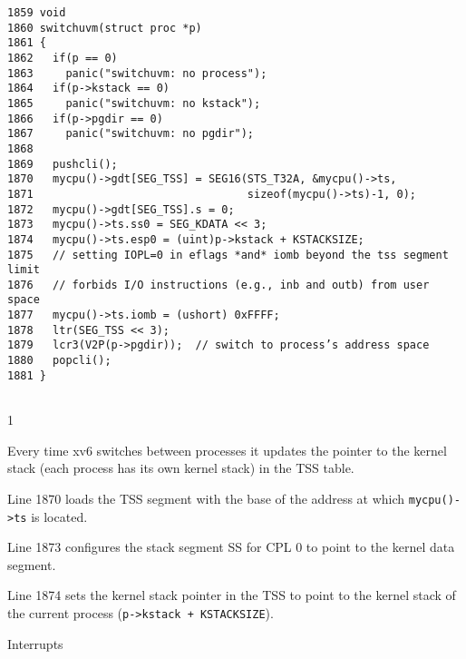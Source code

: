 \documentclass[11pt]{exam}
\def\answers{1}
\begin{document}
\begin{questions}
\begin{parts}
\begin{verbatim}
1859 void
1860 switchuvm(struct proc *p)
1861 {
1862   if(p == 0)
1863     panic("switchuvm: no process");
1864   if(p->kstack == 0)
1865     panic("switchuvm: no kstack");
1866   if(p->pgdir == 0)
1867     panic("switchuvm: no pgdir");
1868 
1869   pushcli();
1870   mycpu()->gdt[SEG_TSS] = SEG16(STS_T32A, &mycpu()->ts,
1871                                 sizeof(mycpu()->ts)-1, 0);
1872   mycpu()->gdt[SEG_TSS].s = 0;
1873   mycpu()->ts.ss0 = SEG_KDATA << 3;
1874   mycpu()->ts.esp0 = (uint)p->kstack + KSTACKSIZE;
1875   // setting IOPL=0 in eflags *and* iomb beyond the tss segment limit
1876   // forbids I/O instructions (e.g., inb and outb) from user space
1877   mycpu()->ts.iomb = (ushort) 0xFFFF;
1878   ltr(SEG_TSS << 3);
1879   lcr3(V2P(p->pgdir));  // switch to process’s address space
1880   popcli();
1881 }
	
\end{verbatim}

\if\answers1 

Every time xv6 switches between processes it updates the pointer to the 
	kernel stack (each process has its own kernel stack) in the TSS table. 

Line 1870 loads the TSS segment with the base of the address at which 
\texttt{mycpu()->ts} is located. 

Line 1873 configures the stack segment SS for CPL 0 to point to the kernel 
data segment. 

Line 1874 sets the kernel stack pointer in the TSS to point to the kernel stack 
of the current process (\texttt{p->kstack + KSTACKSIZE}). 

\fi


\vfill



\end{parts}

\newpage \addpoints

\question Interrupts


\end{questions}
\end{document}
